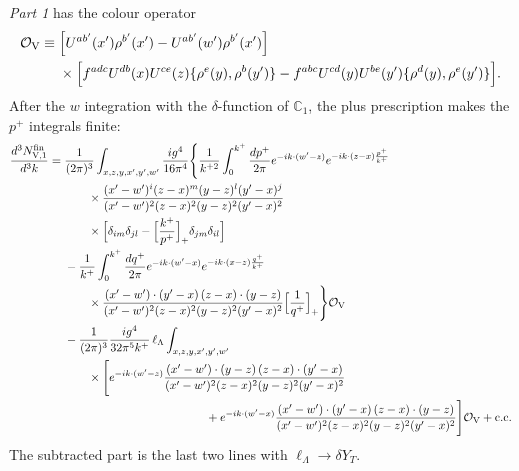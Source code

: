 \documentclass[aps,prd,onecolumn,superscriptaddress,nofootinbib,floatfix,longbibliography,11pt]{revtex4-2}
\numberwithin{equation}{section}
\def\mf#1{\mathbb{#1}}
\newcommand{\lL}{\ell_{\Lambda}}
\newcommand{\Ord}{\mathcal{O}}
\begin{document}
\emph{Part 1} has the colour operator
\begin{align}
\Ord_{\rm V}\equiv{}&\Big[U^{ab'}(x')\rho^{b'}(x')-U^{ab'}(w')\rho^{b'}(x')\Big]\notag\\
&\times\Big[f^{adc}U^{db}(x)U^{ce}(z)\{\rho^e(y),\rho^b(y')\}-f^{abc}U^{cd}(y)U^{be}(y')\{\rho^d(y),\rho^e(y')\}\Big].
\end{align}
After the $w$ integration with the $\delta$-function of $\mf C_1$, the plus prescription makes the $p^+$ integrals finite:
\begin{align}
\frac{d^3N^{\rm fin}_{\rm V,1}}{d^3k}={}&\frac{1}{(2\pi)^3}\int_{x,z,y,x',y',w'}\frac{ig^4}{16\pi^4}\Bigg\{\frac{1}{k^{+2}}\int_0^{k^+}\frac{dp^+}{2\pi}e^{-ik\cdot(w'-z)}e^{-ik\cdot(z-x)\frac{p^+}{k^+}}\notag\\
&\qquad\times\frac{(x'-w')^i(z-x)^m(y-z)^l(y'-x)^j}{(x'-w')^2(z-x)^2(y-z)^2(y'-x)^2}\notag\\
&\qquad\times\Big[\delta_{im}\delta_{jl}-\Big[\frac{k^+}{p^+}\Big]_+\delta_{jm}\delta_{il}\Big]\notag\\
&-\frac{1}{k^+}\int_0^{k^+}\frac{dq^+}{2\pi}e^{-ik\cdot(w'-x)}e^{-ik\cdot(x-z)\frac{q^+}{k^+}}\notag\\
&\qquad\times\frac{(x'-w')\cdot(y'-x)\,(z-x)\cdot(y-z)}{(x'-w')^2(z-x)^2(y-z)^2(y'-x)^2}\Big[\frac{1}{q^+}\Big]_+\Bigg\}\Ord_{\rm V}\notag\\
&-\frac{1}{(2\pi)^3}\frac{ig^4}{32\pi^5k^+}\,\lL\int_{x,z,y,x',y',w'}\notag\\
&\qquad\times\Bigg[e^{-ik\cdot(w'-z)}\frac{(x'-w')\cdot(y-z)\,(z-x)\cdot(y'-x)}{(x'-w')^2(z-x)^2(y-z)^2(y'-x)^2}\notag\\
&\hspace{12em}+e^{-ik\cdot(w'-x)}\frac{(x'-w')\cdot(y'-x)\,(z-x)\cdot(y-z)}{(x'-w')^2(z-x)^2(y-z)^2(y'-x)^2}\Bigg]\Ord_{\rm V}+{\rm c.c.}
\label{eq:finV1}
\end{align}
The subtracted part is the last two lines with $\lL\to\delta Y_T$.
\end{document}
